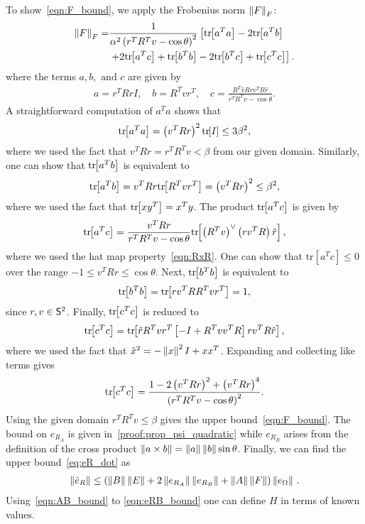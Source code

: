 To show~\cref{eqn:F_bound}, we apply the Frobenius norm \( \left\| F \right\|_F \):
\begin{align*}
	\left\| F \right\|_F =& \frac{1}{\alpha ^2 \left( r^T R^T v - \cos \theta \right)^2} \left[\mathrm{tr}\negthickspace\left[ a^T a \right] - 2 \mathrm{tr}\negthickspace\left[ a^T b \right] \right. \\
	&\left.+ 2 \mathrm{tr}\negthickspace\left[ a^T c  \right] + \mathrm{tr}\negthickspace\left[ b^T b \right]  - 2 \mathrm{tr}\negthickspace\left[ b^T c \right] + \mathrm{tr}\negthickspace\left[ c^T c \right]\right].
\end{align*}
where the terms \( a, b, \text{ and } c \) are given by
\begin{gather*}
	a = r^T R r I , \quad	b = R^T v r^T , \quad c = \frac{R^T \hat{v} R r v^T R \hat{r}}{r^T R^T v - \cos \theta}.
\end{gather*}
A straightforward computation of \( a^T a \) shows that
\begin{gather*}
	\mathrm{tr}\negthickspace\left[ a^T a \right] = \left( v^T R r \right)^2 \mathrm{tr}\negthickspace\left[ I \right] \leq 3 \beta^2 ,
\end{gather*}
where we used the fact that \( v^T R r = r^T R^T v < \beta \) from our given domain.
Similarly, one can show that \( \mathrm{tr}\negthickspace\left[ a^T b \right] \) is equivalent to
\begin{gather*}
	\mathrm{tr}\negthickspace\left[ a^T b \right] = v^T R r \mathrm{tr}\negthickspace\left[ R^T v r^T \right] = \left( v^T R r \right)^2 \leq \beta^2 ,
\end{gather*} 
where we used the fact that \( \mathrm{tr}\negthickspace\left[ x y^T \right] = x^T y \).
The product \( \mathrm{tr}\negthickspace\left[ a^T c \right] \) is given by
\begin{gather*}
	\mathrm{tr}\negthickspace\left[ a^T c \right] = \frac{v^T R r}{r^T R^T v - \cos \theta} \mathrm{tr}\negthickspace\left[ \left( R^T v \right)^\vee \left( r v^T R \right) \hat{r}  \right] ,
\end{gather*}
where we used the hat map property~\cref{eqn:RxR}.
One can show that \(\mathrm{tr}[a^T c] \leq 0 \) over the range \( -1 \leq v^T R r \leq \cos \theta \). 
Next, \( \mathrm{tr}\negthickspace\left[ b^T b \right]\) is equivalent to
\begin{gather*}
	\mathrm{tr}\negthickspace\left[ b^T b \right] = \mathrm{tr}\negthickspace\left[ r v^T R R^T v r^T \right] = 1 ,
\end{gather*}
since \( r,v \in \mathsf{S}^2\).
Finally, \( \mathrm{tr}\negthickspace\left[ c^T c \right] \) is reduced to
\begin{gather*}
	\mathrm{tr}\negthickspace\left[ c^T c \right] = \mathrm{tr}\negthickspace\left[ \hat{r} R^T v r^T \left[ -I + R^T v v^T R \right] r v^T R \hat{r} \right] ,
\end{gather*}
where we used the fact that \( \hat{x}^2 = - \left\| x \right\|^2 I + x x^T\).
Expanding and collecting like terms gives
\begin{gather*}
	\mathrm{tr}\negthickspace\left[ c^T c  \right] = \frac{1 - 2\left( v^T R r \right)^2 + \left( v^T R r \right)^4}{\left( r^T R^T v - \cos \theta \right)^2}. 
\end{gather*}
Using the given domain \( r^T R^T v \leq \beta \) gives the upper bound~\cref{eqn:F_bound}.
The bound on \( e_{R_A} \) is given in~\cref{proof:prop_psi_quadratic} while \( e_{R_B} \) arises from the definition of the cross product \( \left\| a \times b \right\| = \left\| a \right\| \left\| b \right\| \sin \theta \).
Finally, we can find the upper bound~\cref{eq:eR_dot} as
\begin{gather*}
	\left\| \dot{e}_R \right\| \leq \left( \left\| B \right\| \left\| E \right\| + 2 \left\| e_{R_A} \right\| \left\| e_{R_B} \right\| + \left\| A \right\|\left\| F \right\| \right) \left\| e_\Omega \right\| \,.
\end{gather*}
Using~\cref{eqn:AB_bound} to \cref{eqn:eRB_bound} one can define \( H \) in terms of known values.

